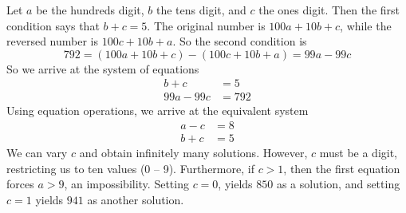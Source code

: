 Let $a$ be the hundreds digit, $b$ the tens digit, and $c$ the ones digit.  Then the first condition says that $b+c=5$.  The original number is $100a+10b+c$, while the reversed number is $100c+10b+a$.  So the second condition is
%
\begin{equation*}
792=\left(100a+10b+c\right)-\left(100c+10b+a\right)=99a-99c
\end{equation*}
%
So we arrive at the system of equations
%
\begin{align*}
b+c&=5\\
99a-99c&=792
\end{align*}
%
Using equation operations, we arrive at the equivalent system
%
\begin{align*}
a-c&=8\\
b+c&=5
\end{align*}
%
We can vary $c$ and obtain infinitely many solutions.  However, $c$ must be a digit, restricting us to ten values (0 -- 9).  Furthermore, if $c>1$, then the first equation forces $a>9$, an impossibility.    Setting $c=0$, yields $850$ as a solution, and setting $c=1$ yields $941$ as another solution.
